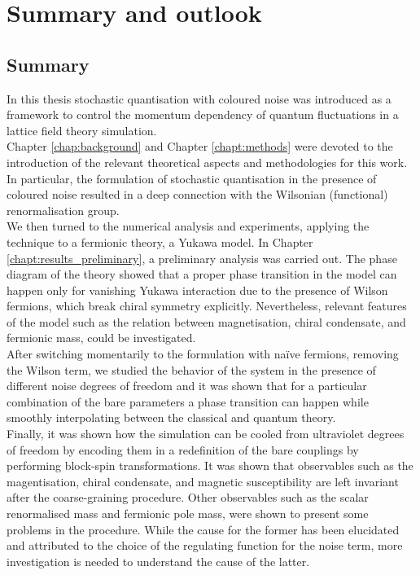 
\chapter{Summary and outlook}
\label{chap:conclusions}
\section*{Summary}
In this thesis stochastic quantisation with coloured noise was introduced as a framework to control the momentum dependency of quantum fluctuations in a lattice field theory simulation. \\
Chapter \ref{chap:background} and Chapter \ref{chapt:methods} were devoted to the introduction of the relevant theoretical aspects and methodologies for this work. In particular, the formulation 
of stochastic quantisation in the presence of coloured noise resulted in a deep connection with the Wilsonian (functional) renormalisation group. \\
We then turned to the numerical analysis and experiments, applying the technique to a fermionic theory, a Yukawa model. In Chapter \ref{chapt:results_preliminary}, a preliminary analysis was carried out. The phase diagram of the theory showed that a proper phase transition in the model can happen only for vanishing Yukawa interaction due to the presence of Wilson 
fermions, which break chiral symmetry explicitly. Nevertheless, relevant features of the model such as the relation between magnetisation, chiral condensate, and fermionic mass, could be investigated. \\
After switching momentarily to the formulation with na\"ive fermions, removing the Wilson term, we studied the behavior of the system in the presence of different noise degrees of freedom and it was shown that for a particular combination of the bare parameters
a phase transition can happen while smoothly interpolating between the classical and quantum theory. \\
Finally, it was shown how the simulation can be cooled from ultraviolet degrees of freedom by encoding them in a redefinition of the bare couplings by performing block-spin transformations. It was shown that observables such as the magentisation, chiral condensate, and magnetic susceptibility are left invariant after the coarse-graining procedure.
Other observables such as the scalar renormalised mass and fermionic pole mass, were shown to present some problems in the procedure. While the cause for the former has been elucidated and attributed to the choice of the regulating function for the noise term, more investigation is needed to understand the cause of the latter. 
\newpage 

